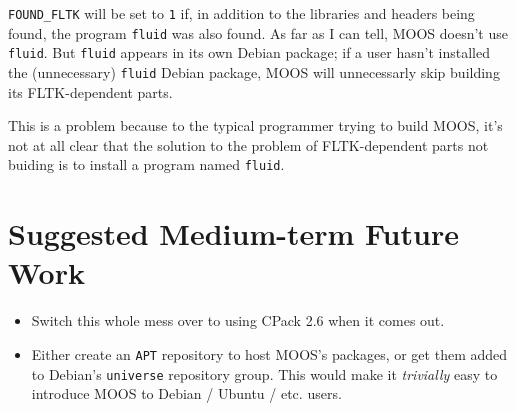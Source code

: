 \documentclass[letterpaper,10pt]{article}
\begin{document}
\begin{itemize}
\begin{itemize}
		\verb|FOUND_FLTK| will be set to \verb|1| if, in addition to
		the libraries and headers being found, the program \verb|fluid|
		was also found.  As far as I can tell, MOOS doesn't use 
		\verb|fluid|.  But \verb|fluid| appears in its own Debian
		package; if a user hasn't installed the (unnecessary)
		\verb|fluid| Debian package, MOOS will unnecessarly skip
		building its FLTK-dependent parts.

		This is a problem because to the typical programmer trying 
		to build MOOS, it's not at all clear that the solution to the
		problem of FLTK-dependent parts not buiding is to install a
		program named \verb|fluid|.
	\end{itemize}

\end{itemize}


\section{Suggested Medium-term Future Work}
\begin{itemize}

 \item Switch this whole mess over to using CPack 2.6 when it comes out.

 \item Either create an \verb|APT| repository to host MOOS's packages, or get them
	added to Debian's \verb|universe| repository group.  This would make it
	\textit{trivially} easy to introduce MOOS to Debian / Ubuntu / etc. users.

\end{itemize}
\end{document}
